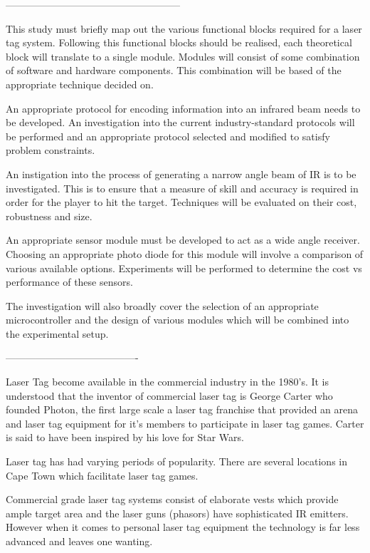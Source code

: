 \iffalse

-----------------------------------------------------

This study must briefly map out the various functional blocks required for a laser tag system. Following this functional blocks should be realised, each theoretical block will translate to a single module. Modules will consist of some combination of software and hardware components. This combination will be based of the appropriate technique decided on.

An appropriate protocol for encoding information into an infrared beam needs to be developed. An investigation into the current industry-standard protocols will be performed and an appropriate protocol selected and modified to satisfy problem constraints.

An instigation into the process of generating a narrow angle beam of IR is to be investigated. This is to ensure that a measure of skill and accuracy is required in order for the player to hit the target. Techniques will be evaluated on their cost, robustness and size.

An appropriate sensor module must be developed to act as a wide angle receiver. Choosing an appropriate photo diode for this module will involve a comparison of various available options. Experiments will be performed to determine the cost vs performance of these sensors.

The investigation will also broadly cover the selection of an appropriate microcontroller and the design of various modules which will be combined into the experimental setup.

----------------------------------------

Laser Tag become available in the commercial industry in the 1980's. It is understood that the inventor of commercial laser tag is George Carter who founded Photon, the first large scale a laser tag franchise that provided an arena and laser tag equipment for it's members to participate in laser tag games. Carter is said to have been inspired by his love for Star Wars.

Laser tag has had varying periods of popularity.
There are several locations in Cape Town which facilitate laser tag games.

Commercial grade laser tag systems consist of elaborate vests which provide ample target area and the laser guns (phasors) have sophisticated IR emitters. However when it comes to personal laser tag equipment the technology is far less advanced and leaves one wanting.

